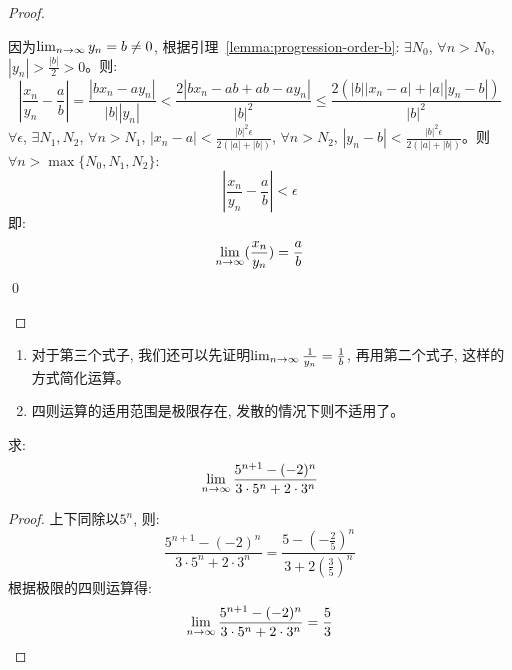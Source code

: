\begin{proof}
\begin{enumerate}
        因为$\lim_{n \to \infty } y_n = b \neq 0$, 根据引理~\ref{lemma:progression-order-b}: $\exists N_0$, $\forall n > N_0$, $|y_n| > \frac{|b|}{2} > 0$。则:
        \begin{equation*}
            \left|\frac{x_n}{y_n} - \frac{a}{b} \right| = \frac{|bx_n - ay_n|}{|b||y_n|} < \frac{2|bx_n-ab+ab-ay_n|}{|b|^2} \le \frac{2(|b||x_n-a|+|a||y_n-b|)}{|b|^2}
        \end{equation*}
        $\forall \epsilon$, $\exists N_1, N_2$, $\forall n > N_1$, $|x_n - a| < \frac{|b|^2\epsilon}{2(|a|+|b|)}$, $\forall n > N_2$, $|y_n - b| < \frac{|b|^2\epsilon}{2(|a|+|b|)}$。则$\forall n > \max\{N_0, N_1, N_2\}$:
        \begin{equation*}
            \left| \frac{x_n}{y_n} - \frac{a}{b} \right| < \epsilon
        \end{equation*}
        即:
        \begin{equation*}
            \lim_{n \to \infty } (\frac{x_n}{y_n}) = \frac{a}{b}
        \end{equation*}
        \qed
    \end{enumerate}
\end{proof}
\begin{remark}
    \begin{enumerate}
        \item 对于第三个式子, 我们还可以先证明$\lim_{n \to \infty } \frac{1}{y_n} = \frac{1}{b}$, 再用第二个式子, 这样的方式简化运算。
        \item 四则运算的适用范围是极限存在, 发散的情况下则不适用了。
    \end{enumerate}
\end{remark}

\begin{example}
    求:
    \begin{equation*}
        \lim_{n \to \infty } \frac{5^{n+1}-(-2)^n}{3 \cdot 5^n + 2\cdot 3^n} 
    \end{equation*}
\end{example}
\begin{proof}
    上下同除以$5^n$, 则:
    \begin{equation*}
        \frac{5^{n+1}-(-2)^n}{3 \cdot 5^n + 2\cdot 3^n} = \frac{5-\left(-\frac{2}{5}\right)^n}{3+2\left(\frac{3}{5}\right)^n}
    \end{equation*}
    根据极限的四则运算得:
    \begin{equation*}
        \lim_{n \to \infty } \frac{5^{n+1}-(-2)^n}{3 \cdot 5^n + 2\cdot 3^n} = \frac{5}{3}
    \end{equation*}
\end{proof}


